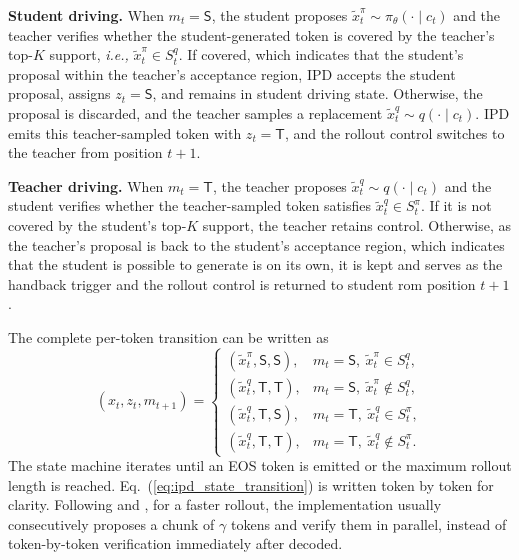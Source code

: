 \documentclass{article} %
\begin{document}
\noindent\textbf{Student driving.} When $m_t=\mathsf{S}$, the student proposes $\widetilde{x}_t^\pi\sim\pi_\theta(\cdot\mid c_t)$ and the teacher verifies whether the student-generated token is covered by the teacher's top-$K$ support, \emph{i.e.,} $\widetilde{x}_t^\pi \in S_t^q$. If covered, which indicates that the student's proposal within the teacher's acceptance region, IPD accepts the student proposal, assigns $z_t=\mathsf{S}$, and remains in student driving state. Otherwise, the proposal is discarded, and the teacher samples a replacement $\widetilde{x}_t^q\sim q(\cdot\mid c_t)$. IPD emits this teacher-sampled token with $z_t=\mathsf{T}$, and the rollout control switches to the teacher from position $t+1$.

\noindent\textbf{Teacher driving.} When $m_t=\mathsf{T}$, the teacher proposes $\widetilde{x}_t^q\sim q(\cdot\mid c_t)$ and the student verifies whether the teacher-sampled token satisfies $\widetilde{x}_t^q\in S_t^\pi$. If it is not covered by the student's top-$K$ support, the teacher retains control. Otherwise, as the teacher's proposal is back to the student's acceptance region, which indicates that the student is possible to generate is on its own, it is kept and serves as the handback trigger and the rollout control is returned to student rom position $t+1$.

The complete per-token transition can be written as
\begin{equation}
    (x_t,z_t,m_{t+1})=
    \begin{cases}
        (\widetilde{x}_t^\pi,\mathsf{S},\mathsf{S}), & m_t=\mathsf{S},\ \widetilde{x}_t^\pi\in S_t^q,\\
        (\widetilde{x}_t^q,\mathsf{T},\mathsf{T}), & m_t=\mathsf{S},\ \widetilde{x}_t^\pi\notin S_t^q,\\
        (\widetilde{x}_t^q,\mathsf{T},\mathsf{S}), & m_t=\mathsf{T},\ \widetilde{x}_t^q\in S_t^\pi,\\
        (\widetilde{x}_t^q,\mathsf{T},\mathsf{T}), & m_t=\mathsf{T},\ \widetilde{x}_t^q\notin S_t^\pi.
    \end{cases}
    \label{eq:ipd_state_transition}
\end{equation}
The state machine iterates until an EOS token is emitted or the maximum rollout length is reached. Eq.~(\ref{eq:ipd_state_transition}) is written token by token for clarity. Following \citet{leviathan2023fast} and \citet{skd}, for a faster rollout, the implementation usually consecutively proposes a chunk of $\gamma$ tokens and verify them in parallel, instead of token-by-token verification immediately after decoded. 
\end{document}
